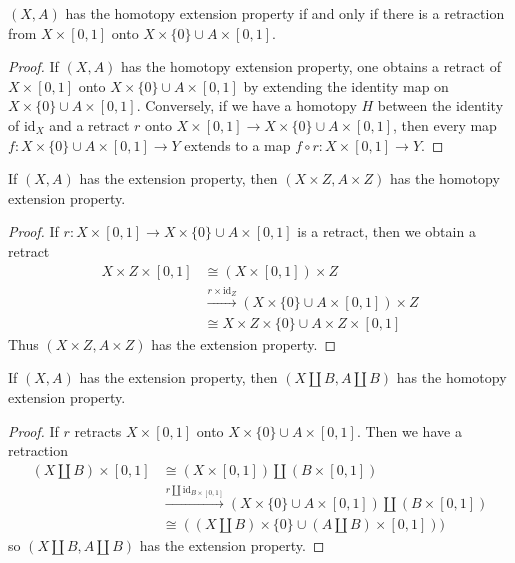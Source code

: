 \begin{lemma}
    $(X,A)$ has the homotopy extension property if and only if there is a retraction from $X \times [0,1]$ onto $X \times \{ 0 \} \cup A \times [0,1]$.
\end{lemma}
\begin{proof}
    If $(X,A)$ has the homotopy extension property, one obtains a retract of $X \times [0,1]$ onto $X \times \{ 0 \} \cup A \times [0,1]$ by extending the identity map on $X \times \{ 0 \} \cup A \times [0,1]$. Conversely, if we have a homotopy $H$ between the identity of $\text{id}_X$ and a retract $r$ onto $X \times [0,1] \to X \times \{ 0 \} \cup A \times [0,1]$, then every map $f: X \times \{ 0 \} \cup A \times [0,1] \to Y$ extends to a map $f \circ r: X \times [0,1] \to Y$.
\end{proof}

\begin{corollary}
    If $(X,A)$ has the extension property, then $(X \times Z, A \times Z)$ has the homotopy extension property.
\end{corollary}
\begin{proof}
    If $r: X \times [0,1] \to X \times \{ 0 \} \cup A \times [0,1]$ is a retract, then we obtain a retract
    \begin{align*}
        X \times Z \times [0,1] &\cong (X \times [0,1]) \times Z\\
        &\xrightarrow{r \times \text{id}_Z} (X \times \{ 0 \} \cup A \times [0,1]) \times Z\\
        &\cong X \times Z \times \{ 0 \} \cup A \times Z \times [0,1]
    \end{align*}
    Thus $(X \times Z, A \times Z)$ has the extension property.
\end{proof}

\begin{corollary}
    If $(X,A)$ has the extension property, then $(X \coprod B, A \coprod B)$ has the homotopy extension property.
\end{corollary}
\begin{proof}
    If $r$ retracts $X \times [0,1]$ onto $X \times \{ 0 \} \cup A \times [0,1]$. Then we have a retraction
    \begin{align*}
        (X \coprod B) \times [0,1] &\cong (X \times [0,1]) \coprod (B \times [0,1])\\
        &\xrightarrow{r \coprod \text{id}_{B \times [0,1]}} (X \times \{ 0 \} \cup A \times [0,1]) \coprod (B \times [0,1])\\
        &\cong ((X \coprod B) \times \{ 0 \} \cup (A \coprod B) \times [0,1]))
    \end{align*}
    so $(X \coprod B, A \coprod B)$ has the extension property.
\end{proof}

